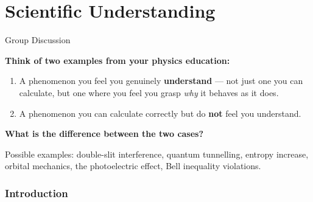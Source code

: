 \documentclass[fleqn]{beamer}
\begin{document}
\part{Scientific Understanding}

\begin{frame}{Group Discussion}

  \textbf{Think of two examples from your physics education:}

  \vspace{0.8em}
  \begin{enumerate}
  \item A phenomenon you feel you genuinely \textbf{understand} ---
    not just one you can calculate, but one where you feel you grasp
    \emph{why} it behaves as it does.
  \item A phenomenon you can calculate correctly but do \textbf{not}
    feel you understand.
  \end{enumerate}

  \vspace{0.8em}
  \textbf{What is the difference between the two cases?}

  \vspace{0.5em}
  \small Possible examples: double-slit interference, quantum
  tunnelling, entropy increase, orbital mechanics, the photoelectric
  effect, Bell inequality violations.

\end{frame}

\section{Introduction}
\end{document}
